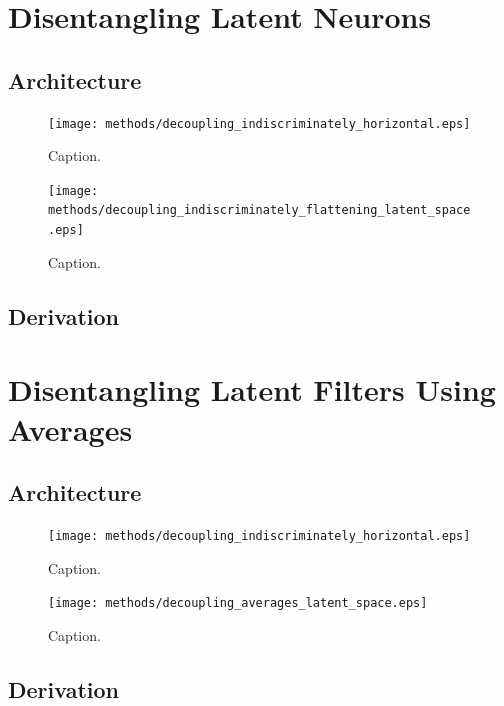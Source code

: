 %
%
%
%
%
\section{Disentangling Latent Neurons}
\lipsum[2]
\subsection{Architecture}
\begin{figure}[H]
\centering
\captionsetup{justification=centering}
\texttt{[image: methods/decoupling\_indiscriminately\_horizontal.eps]}
\caption{Caption.}
\label{fig:decoupling_indiscriminately_horizontal}
\end{figure}

\begin{figure}[H]
\centering
\captionsetup{justification=centering}
\texttt{[image: methods/decoupling\_indiscriminately\_flattening\_latent\_space.eps]}
\caption{Caption.}
\label{fig:decoupling_indiscriminately_flattening_latent_space}
\end{figure}

\subsection{Derivation}



%
%
%
%
%
\section{Disentangling Latent Filters Using Averages}
\lipsum[2]
\subsection{Architecture}
\begin{figure}[H]
\centering
\captionsetup{justification=centering}
\texttt{[image: methods/decoupling\_indiscriminately\_horizontal.eps]}
\caption{Caption.}
\label{fig:decoupling_indiscriminately_horizontal}
\end{figure}

\begin{figure}[H]
\centering
\captionsetup{justification=centering}
\texttt{[image: methods/decoupling\_averages\_latent\_space.eps]}
\caption{Caption.}
\label{fig:decoupling_averages_latent_space}
\end{figure}

\subsection{Derivation}

